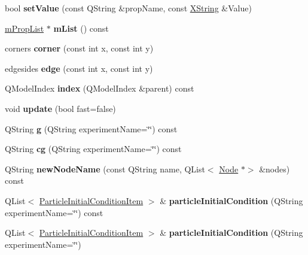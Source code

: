 \begin{DoxyCompactItemize}
bool {\bfseries set\+Value} (const Q\+String \&prop\+Name, const \hyperlink{class_x_string}{X\+String} \&Value)
\item 
\mbox{\label{class_node_afb3b8da1e1b42a7798eef14a6072019f}} 
\hyperlink{classm_prop_list}{m\+Prop\+List} $\ast$ {\bfseries m\+List} () const
\item 
\mbox{\label{class_node_a5209d30aa6f82764e4acbb7b6deeb60a}} 
corners {\bfseries corner} (const int x, const int y)
\item 
\mbox{\label{class_node_a9fee6708a499f3adf7ace32e9d94a853}} 
edgesides {\bfseries edge} (const int x, const int y)
\item 
\mbox{\label{class_node_a1a663b6e69ff25b315454c96ad1672b0}} 
Q\+Model\+Index {\bfseries index} (Q\+Model\+Index \&parent) const
\item 
\mbox{\label{class_node_a7ee7146af9c104f8ac217859df04d1fb}} 
void {\bfseries update} (bool fast=false)
\item 
\mbox{\label{class_node_a5b05a96c9250a02ef942fac17f81ca25}} 
Q\+String {\bfseries g} (Q\+String experiment\+Name=\char`\"{}\char`\"{}) const
\item 
\mbox{\label{class_node_ad487b56adeb9a726928e135864dcd061}} 
Q\+String {\bfseries cg} (Q\+String experiment\+Name=\char`\"{}\char`\"{}) const
\item 
\mbox{\label{class_node_ae56f5b0cd8095c96f00956c3e50a634e}} 
Q\+String {\bfseries new\+Node\+Name} (const Q\+String name, Q\+List$<$ \hyperlink{class_node}{Node} $\ast$$>$ \&nodes) const
\item 
\mbox{\label{class_node_a67d3a97280a38f8cca0341587fbce986}} 
Q\+List$<$ \hyperlink{struct_particle_initial_condition_item}{Particle\+Initial\+Condition\+Item} $>$ \& {\bfseries particle\+Initial\+Condition} (Q\+String experiment\+Name=\char`\"{}\char`\"{}) const
\item 
\mbox{\label{class_node_ad6f529587aec9820370c967a4f74171c}} 
Q\+List$<$ \hyperlink{struct_particle_initial_condition_item}{Particle\+Initial\+Condition\+Item} $>$ \& {\bfseries particle\+Initial\+Condition} (Q\+String experiment\+Name=\char`\"{}\char`\"{})
$$
\end{DoxyCompactItemize}
